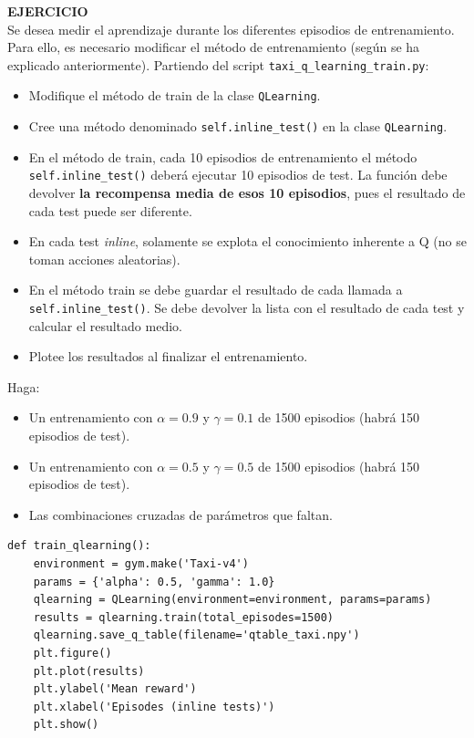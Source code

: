 \documentclass{article}
\begin{document}
 
\begin{exercise}
\textbf{EJERCICIO}\\
Se desea medir el aprendizaje durante los diferentes episodios de entrenamiento. Para ello, es necesario modificar el método de entrenamiento (según se ha explicado anteriormente). Partiendo del script \texttt{taxi\_q\_learning\_train.py}: 
\begin{itemize}
    \item Modifique el método de train de la clase \texttt{QLearning}.
    \item Cree una método denominado \texttt{self.inline\_test()} en la clase \texttt{QLearning}. 
    \item En el método de train, cada 10 episodios de entrenamiento el método \texttt{self.inline\_test()} deberá ejecutar 10 episodios de test. La función debe devolver \textbf{la recompensa media de esos 10 episodios}, pues el resultado de cada test puede ser diferente.
    \item En cada test \textit{inline}, solamente se explota el conocimiento inherente a Q (no se toman acciones aleatorias).
    \item En el método train se debe guardar el resultado de cada llamada a \texttt{self.inline\_test()}. Se debe devolver la lista con el resultado de cada test y calcular el resultado medio.
     \item Plotee los resultados al finalizar el entrenamiento.
\end{itemize}
Haga:
\begin{itemize}
    \item Un entrenamiento con $\alpha=0.9$ y $\gamma=0.1$ de 1500 episodios (habrá 150 episodios de test).
    \item Un entrenamiento con $\alpha=0.5$ y $\gamma=0.5$ de 1500 episodios (habrá 150 episodios de test).    
    \item Las combinaciones cruzadas de parámetros que faltan.
\end{itemize}
\begin{verbatim}
def train_qlearning():
    environment = gym.make('Taxi-v4')
    params = {'alpha': 0.5, 'gamma': 1.0}
    qlearning = QLearning(environment=environment, params=params)
    results = qlearning.train(total_episodes=1500)
    qlearning.save_q_table(filename='qtable_taxi.npy')
    plt.figure()
    plt.plot(results)
    plt.ylabel('Mean reward')
    plt.xlabel('Episodes (inline tests)')
    plt.show()
\end{verbatim}
\end{exercise}
\end{document}
